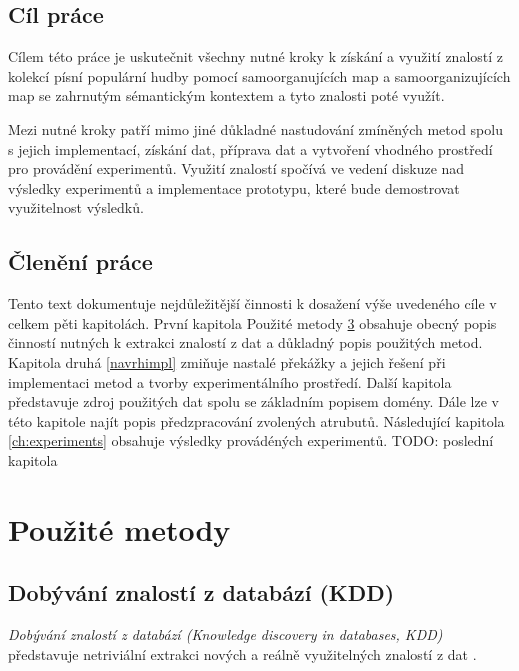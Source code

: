 \documentclass[thesis=M,czech]{FITthesis}[2012/06/26]
\begin{document}
\begin{introduction}
	
	\section{Cíl práce}
	Cílem této práce je uskutečnit všechny nutné kroky k získání a využití znalostí z kolekcí písní populární hudby pomocí samoorganujících map a samoorganizujících map se zahrnutým sémantickým kontextem a tyto znalosti poté využít.
	
Mezi nutné kroky patří mimo jiné důkladné nastudování zmíněných metod spolu s jejich implementací, získání dat, příprava dat a vytvoření vhodného prostředí pro provádění experimentů. Využití znalostí spočívá ve vedení diskuze nad výsledky experimentů a implementace prototypu, které bude demostrovat využitelnost výsledků.




	\section{Členění práce}
	Tento text dokumentuje nejdůležitější činnosti k dosažení výše uvedeného cíle v celkem pěti kapitolách. První kapitola Použité metody \ref{poumetod} obsahuje obecný popis činností nutných k extrakci znalostí z dat a důkladný popis použitých metod. Kapitola druhá \ref{navrhimpl} zmiňuje nastalé překážky a jejich řešení při implementaci metod a tvorby experimentálního prostředí. Další kapitola \label{ch:empl_prepro} představuje zdroj použitých dat spolu se základním popisem domény. Dále lze v této kapitole najít popis předzpracování zvolených atrubutů. Následující kapitola \ref{ch:experiments} obsahuje výsledky provádéných experimentů.  TODO: poslední kapitola
	

	
	
\end{introduction}

\chapter{Použité metody}\label{poumetod}
\section{Dobývání znalostí z databází (KDD)}
\textit{Dobývání znalostí z databází (Knowledge discovery in databases, KDD)} představuje netriviální extrakci nových a reálně využitelných znalostí z dat \cite{kddb}. 
\end{document}
